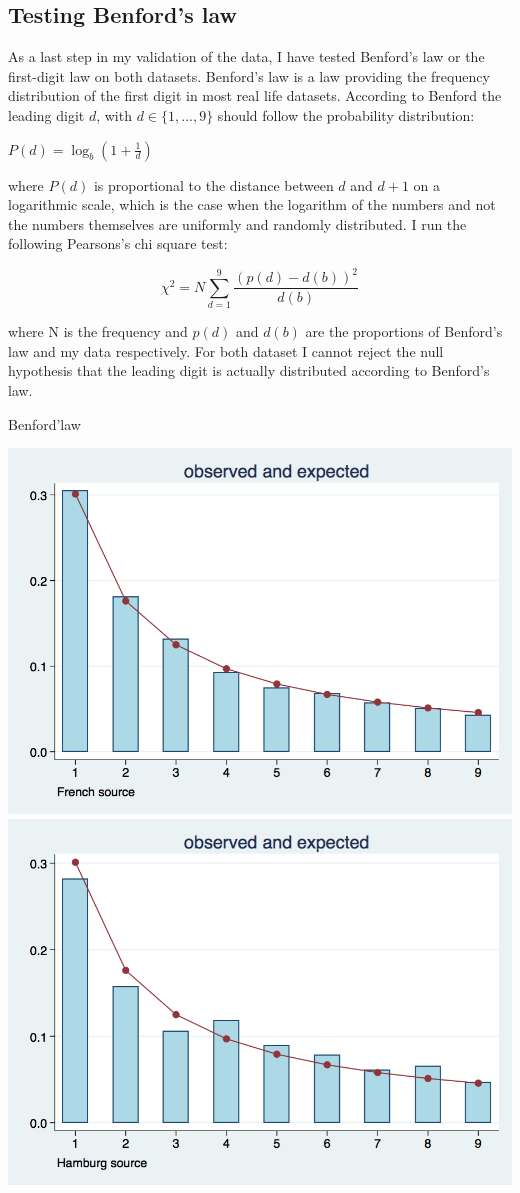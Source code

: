 \documentclass[12pt,a4paper,titlepage]{article}
\begin{document}
\subsection{Testing Benford’s law}
As a last step in my validation of the data, I have tested Benford’s law or the first-digit law on both datasets. Benford’s law is a law providing the frequency distribution of the first digit in most real life datasets. According to Benford the leading digit $d$, with $d \in \{1,...,9\}$ should follow the probability distribution: 
\begin{center}
$P(d)=\log_b(1+\frac{1}{d})$
\end{center}
where $P(d)$ is proportional to the distance between $d$ and $d+1$ on a logarithmic scale, which is the case when the logarithm of the numbers and not the numbers themselves are uniformly and randomly distributed. I run the following Pearsons’s chi square test:
\begin{center}
$$\chi^2=N\sum_{d=1}^{9}\frac{(p(d)-d(b))^2}{d(b)}$$
\end{center}
where N is the frequency and $p(d)$ and $d(b)$ are the proportions of Benford’s law and my data respectively. For both dataset I cannot reject the null hypothesis that the leading digit is actually distributed according to Benford’s law.
\caption{Benford'law}
\includegraphics[scale=.28]{benford_fr.png}
\includegraphics[scale=.28]{benford_hb.png}
\end{document}
